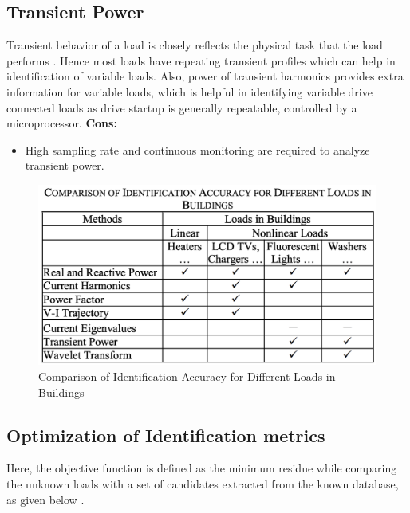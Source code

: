 \documentclass[11pt, a4paper]{article} %
\begin{document}
\subsection{Transient Power}
Transient behavior of a load is closely reflects the physical task that the load performs \cite{srshaw}. Hence most loads have repeating transient profiles which can help in identification of variable loads. Also, power of transient harmonics provides extra information for variable loads, which is helpful in identifying variable drive connected loads as drive startup is generally repeatable, controlled by a microprocessor. 
\newline
\textbf{Cons:}
\begin{itemize}
    \item High sampling rate and continuous monitoring are required to analyze transient power.
\end{itemize}
\begin{figure}[htpb!] %
    \centering %
    \includegraphics[scale=0.6]{figure/methodsfig.png} %
    \caption{Comparison of Identification Accuracy for Different Loads in Buildings\cite{192069}} %
    \label{fig:my_label} %
\end{figure}

\subsection{Optimization of Identification metrics}
Here, the objective function is defined as the minimum residue while comparing the unknown loads with a set of candidates extracted from the known database, as given below \cite{97667}.
\end{document}
